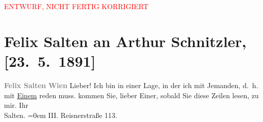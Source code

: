 
\begin{center}
            \textcolor{red}{ENTWURF, NICHT FERTIG KORRIGIERT}
                      \end{center}
            
         \renewcommand{\erwaehnteOrte}{Orte: Reisnerstraße, Wien}
         \renewcommand{\erwaehnteWerke}{}
               \section[Felix Salten an Arthur Schnitzler, {[}23. 5. 1891{]}]{ Felix Salten an Arthur Schnitzler, {[}23. 5. 1891{]}}\nopagebreak{}\rehead{ }\begin{ledgroupsized}[t]{13cm}\normalsize\beginnumbering \toendnotes[C]{\smallbreak\pagebreak[2]} 
\pstart
           \noindent{}\centering{}{\pb}\textcolor{gray}{\textbf{\textcolor{gray}{\textbf{Felix Salten}}}}\textcolor{gray}{\textbf{}}\pend
           \pstart
           \noindent{}\textcolor{gray}{\textbf{\textcolor{gray}{\textbf{Wien}}}}\pend
           \pstart
           {\pb}Lieber! Ich bin in einer Lage, in der ich mit Jemanden, d. h. mit \uline{Einem} reden muss. 
               kommen Sie, lieber Einer, sobald Sie diese Zeilen lesen, zu mir.\pend
           \pstart
           Ihr{\\[\baselineskip]}\spacefill\mbox{Salten.}\pend
           \leftskip=0em{}\pstart
           \noindent{}III. Reisnerstraße 113.
            \pend
           
         
         \endnumbering{}\end{ledgroupsized}\begin{anhang}\end{anhang}\newcommand{\dateiname}{L03102}\newcommand{\titel}{Felix Salten an Arthur Schnitzler, [23. 5. 1891]}\newcommand{\editorInnen}{Martin Anton Müller und Laura Untner}
      
